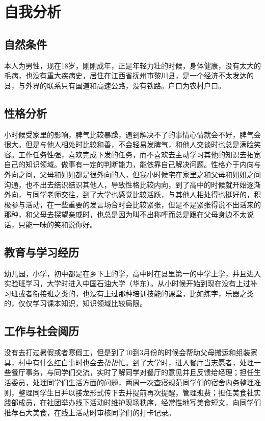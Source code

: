 \documentclass{article}
\begin{document}
\thispagestyle{empty}
\newpage
\setcounter{page}{1}
\section{自我分析}
\subsection{自然条件}
本人为男性，现在18岁，刚刚成年，正是年轻力壮的时候，身体健康，没有太大的毛病，也没有重大疾病史，居住在江西省抚州市黎川县，是一个经济不太发达的县，与外界的联系只有国道和高速公路，没有铁路。户口为农村户口。
\subsection{性格分析}
小时候受家里的影响，脾气比较暴躁，遇到解决不了的事情心情就会不好，脾气会很大。但是与他人相处时比较和善，不会轻易发脾气，和他人交谈时也总是满脸笑容。工作任务性强，喜欢完成下发的任务，而不喜欢去主动学习其他的知识去拓宽自己的知识领域。做事有一定的判断能力，能依靠自己解决问题。性格介于内向与外向之间，父母和姐姐都是很外向的人，但我小时候宅在家里之和父母和姐姐之间沟通，也不出去结识结识其他人，导致性格比较内向，到了高中的时候就开始逐渐外向，与同学老师交往，到了大学也感觉比较活跃，与其他人相处得也挺好的，积极参与活动，在一些重要的发言场合时会比较紧张，但是不是紧张得说不出话来的那种，和父母去探望亲戚时，也总是因为叫不出称呼而总是跟在父母身边不太说话，只能一味的笑和说你好。
\subsection{教育与学习经历}
幼儿园，小学，初中都是在乡下上的学，高中时在县里第一的中学上学，并且进入实验班学习，大学时进入中国石油大学（华东）。从小时候开始到现在没有上过补习班或者衔接班之类的，也没有上过那种培训技能的课堂，比如练字，乐器之类的，仅仅学习课本知识，知识领域比较局限。
\subsection{工作与社会阅历}
没有去打过暑假或者寒假工，但是到了10到3月份的时候会帮助父母搬运和组装家具，村中有什么红白事时也会去帮帮忙。到了大学时，进入餐厅当志愿者，处理一些餐厅事务，与同学们交流，实时了解同学对餐厅的意见并且反馈给经理；担任生活委员，处理同学们生活方面的问题，两周一次查寝规范同学们的宿舍内务整理准则，整理同学生日并以接龙形式传下去并提前再次提醒，管理班费；担任美食社实践部成员，在社团举办线下活动时维护现场秩序，经常性地写美食短文，向同学们推荐石大美食，在线上活动时审核同学们的打卡记录。
\end{document}
